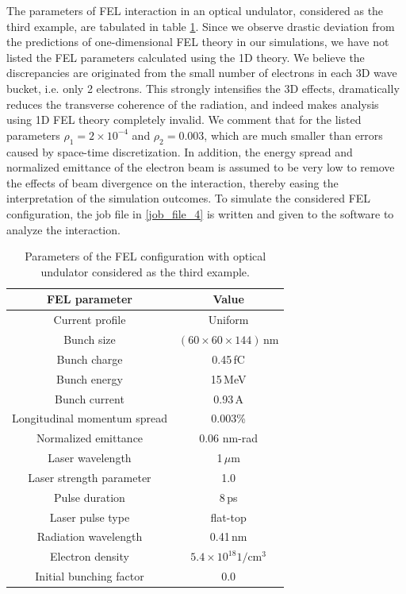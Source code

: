 The parameters of FEL interaction in an optical undulator, considered as the third example, are tabulated in table \ref{example3}.
%
Since we observe drastic deviation from the predictions of one-dimensional FEL theory in our simulations, we have not listed the FEL parameters calculated using the 1D theory.
%
We believe the discrepancies are originated from the small number of electrons in each 3D wave bucket, i.e. only 2 electrons.
%
This strongly intensifies the 3D effects, dramatically reduces the transverse coherence of the radiation, and indeed makes analysis using 1D FEL theory completely invalid.
%
We comment that for the listed parameters $\rho_1=2\times10^{-4}$ and $\rho_2=0.003$, which are much smaller than errors caused by space-time discretization.
%
In addition, the energy spread and normalized emittance of the electron beam is assumed to be very low to remove the effects of beam divergence on the interaction, thereby easing the interpretation of the simulation outcomes.
%
To simulate the considered FEL configuration, the  job file in \ref{job_file_4} is written and given to the software to analyze the interaction.
%
\begin{table}
\label{example3}
\caption{Parameters of the FEL configuration with optical undulator considered as the third example.}
\centering
\begin{tabular}{|c||c|}
\hline
FEL parameter & Value \\ \hline \hline
Current profile & Uniform \\ \hline
Bunch size & $(60\times60\times144)$\,nm \\ \hline
Bunch charge & 0.45\,fC \\ \hline
Bunch energy & 15\,MeV \\	\hline
Bunch current & 0.93\,A \\ \hline
Longitudinal momentum spread & 0.003\% \\ \hline
Normalized emittance & 0.06 nm-rad \\	\hline
Laser wavelength & 1\,$\mu$m \\ \hline
Laser strength parameter & 1.0 \\ \hline
Pulse duration & 8\,ps \\ \hline
Laser pulse type & flat-top \\ \hline
Radiation wavelength & 0.41\,nm \\ \hline
Electron density & $5.4\times10^{18} 1/\text{cm}^3$ \\ \hline
Initial bunching factor & $0.0$ \\ \hline
\end{tabular}
\end{table}

